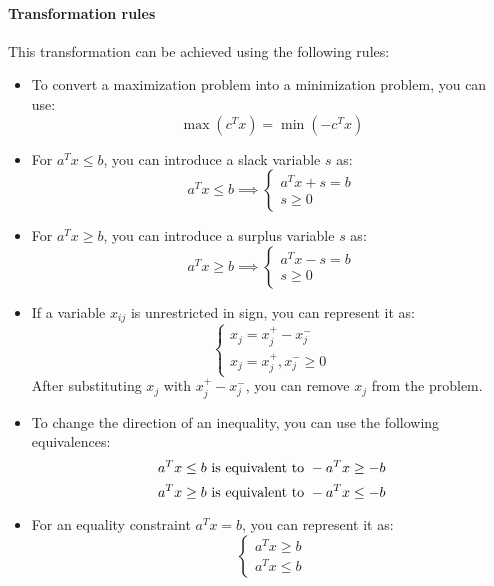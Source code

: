 \paragraph*{Transformation rules}
This transformation can be achieved using the following rules:
\begin{itemize}
    \item To convert a maximization problem into a minimization problem, you can use: 
        \[\max{(c^Tx)}=\min{(-c^Tx)}\]
    \item For $a^Tx \leq b$, you can introduce a slack variable $s$ as: 
        \[a^Tx \leq b \implies
        \begin{cases}
            a^Tx+s=b \\
            s \geq 0
        \end{cases}\]
    \item For $a^Tx \geq b$, you can introduce a surplus variable $s$ as: 
        \[a^Tx \geq b \implies 
        \begin{cases}
            a^Tx-s=b \\
            s \geq 0
        \end{cases}\]
    \item If a variable $x_{ij}$ is unrestricted in sign, you can represent it as:
        \[\begin{cases}
            x_j=x_j^{+}-x_j^{-} \\
            x_j=x_j^{+},x_j^{-} \geq 0
        \end{cases}\]
        After substituting $x_j$ with $x_j^{+}-x_j^{-}$, you can remove $x_j$ from the problem. 
    \item To change the direction of an inequality, you can use the following equivalences:
        \[a^Tx \leq b \textnormal{ is equivalent to } -a^Tx \geq -b\]
        \[a^Tx \geq b \textnormal{ is equivalent to } -a^Tx \leq -b\]
    \item For an equality constraint $a^Tx = b$, you can represent it as:
        \[\begin{cases}
            a^Tx \geq b \\
            a^Tx \leq b
        \end{cases}\]
\end{itemize}
